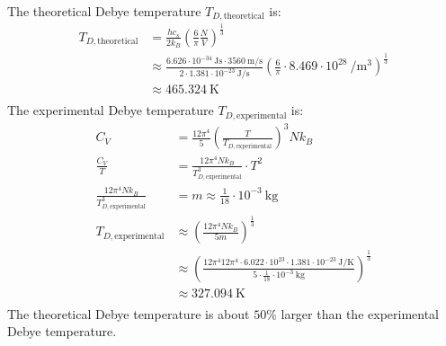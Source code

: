 \documentclass{article}
\begin{document}
The theoretical Debye temperature $T_{D,\text{theoretical}}$ is:
\begin{equation}
    \begin{split}
        T_{D,\text{theoretical}} & = \frac{hc_s}{2k_B}{\left(\frac{6}{\pi}\frac{N}{V}\right)}^{\frac{1}{3}} \\
        & \approx \frac{6.626 \cdot 10^{-34}~\unit{\joule\second} \cdot 3560~\unit{\meter\per\second}}{2 \cdot 1.381 \cdot 10^{-23}~\unit{\joule\per\second}}{\left(\frac{6}{\pi} \cdot 8.469 \cdot 10^{28}~\unit{\per\meter\cubed}\right)}^{\frac{1}{3}} \\
        & \approx 465.324~\unit{\kelvin} \\
    \end{split}
\end{equation}
The experimental Debye temperature $T_{D,\text{experimental}}$ is:
\begin{equation}
    \begin{split}
        C_V & = \frac{12\pi^4}{5} {\left(\frac{T}{T_{D,\text{experimental}}}\right)}^3 Nk_B \\
        \frac{C_V}{T} & = \frac{12\pi^4 Nk_B}{T_{D,\text{experimental}}^3} \cdot T^2 \\
        \frac{12\pi^4 Nk_B}{T_{D,\text{experimental}}^3} & = m \approx \frac{1}{18} \cdot 10^{-3}~\unit{\kilo\gram} \\
        T_{D,\text{experimental}} & \approx {\left(\frac{12\pi^4 Nk_B}{5m}\right)}^{\frac{1}{3}} \\
        & \approx {\left(\frac{12\pi^4 12\pi^4 \cdot 6.022 \cdot 10^{23} \cdot 1.381 \cdot 10^{-23}~\unit{\joule\per\kelvin}}{5 \cdot \frac{1}{18} \cdot 10^{-3}~\unit{\kilo\gram}}\right)}^{\frac{1}{3}} \\
        & \approx 327.094~\unit{\kelvin} \\
    \end{split}
\end{equation}
The theoretical Debye temperature is about $50\%$ larger than the experimental Debye temperature.

\clearpage
\end{document}
